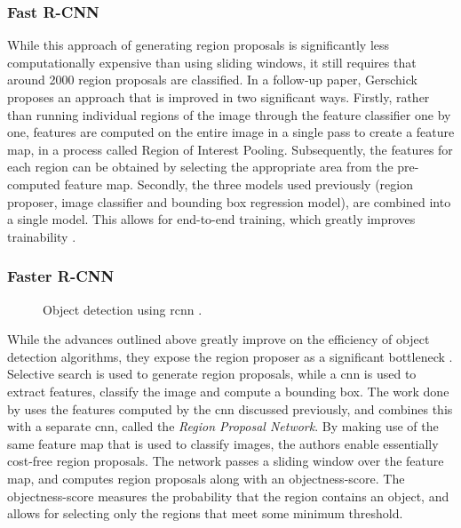 \documentclass[\rootfolder/main.tex]{subfiles}
\begin{document}
\subsubsection{Fast R-CNN}

While this approach of generating region proposals is significantly less computationally expensive than using sliding windows, it still requires that around 2000 region proposals are classified.
In a follow-up paper, Gerschick proposes an approach that is improved in two significant ways.
Firstly, rather than running individual regions of the image through the feature classifier one by one, features are computed on the entire image in a single pass to create a feature map, in a process called Region of Interest Pooling.
Subsequently, the features for each region can be obtained by selecting the appropriate area from the pre-computed feature map.
Secondly, the three models used previously (region proposer, image classifier and bounding box regression model), are combined into a single model.
This allows for end-to-end training, which greatly improves trainability \cite{Girshick2015}.

\subsubsection{Faster R-CNN}

\begin{wrapfigure}{r}{0.4\columnwidth}
    \caption[Object detection using Faster \acrshort{rcnn}.]{Object detection using \acrshort{rcnn} \cite{Ren2017}.}
    \label{fig:faster-rcnn}
\end{wrapfigure}

While the advances outlined above greatly improve on the efficiency of object detection algorithms, they expose the region proposer as a significant bottleneck \cite{Ren2017}.
Selective search is used to generate region proposals, while a \acrshort{cnn} is used to extract features, classify the image and compute a bounding box.
The work done by \cite{Ren2017} uses the features computed by the \acrshort{cnn} discussed previously, and combines this with a separate \acrshort{cnn}, called the \emph{Region Proposal Network}.
By making use of the same feature map that is used to classify images, the authors enable essentially cost-free region proposals.
The network passes a sliding window over the feature map, and computes region proposals along with an objectness-score.
The objectness-score measures the probability that the region contains an object, and allows for selecting only the regions that meet some minimum threshold.
\end{document}
